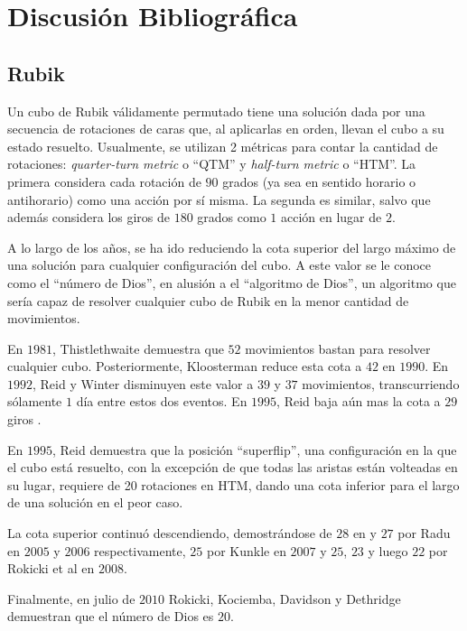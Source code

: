 \chapter{Discusión Bibliográfica}

\section*{Rubik}
Un cubo de Rubik válidamente permutado tiene una solución dada por una secuencia de rotaciones de caras que, al aplicarlas en orden, llevan el cubo a su estado resuelto. Usualmente, se utilizan 2 métricas para contar la cantidad de rotaciones: \emph{quarter-turn metric} o ``QTM'' y \emph{half-turn metric} o ``HTM''\cite{qtmhtm}. La primera considera cada rotación de $90$ grados (ya sea en sentido horario o antihorario) como una acción por sí misma. La segunda es similar, salvo que además considera los giros de $180$ grados como $1$ acción en lugar de $2$.

A lo largo de los años, se ha ido reduciendo la cota superior del largo máximo de una solución para cualquier configuración del cubo. A este valor se le conoce como el ``número de Dios'', en alusión a el ``algoritmo de Dios'', un algoritmo que sería capaz de resolver cualquier cubo de Rubik en la menor cantidad de movimientos.

En $1981$, Thistlethwaite\cite{thistlethwaite} demuestra que $52$ movimientos bastan para resolver cualquier cubo. Posteriormente, Kloosterman\cite{kloosterman} reduce esta cota a $42$ en $1990$. En $1992$, Reid y Winter disminuyen este valor a $39$ y $37$ movimientos, transcurriendo sólamente $1$ día entre estos dos eventos\cite{reid39}\cite{winter}. En $1995$, Reid baja aún mas la cota a $29$ giros \cite{reid29}.

En $1995$, Reid demuestra que la posición ``superflip'', una configuración en la que el cubo está resuelto, con la excepción de que todas las aristas están volteadas en su lugar, requiere de 20 rotaciones\cite{superflip} en HTM, dando una cota inferior para el largo de una solución en el peor caso.

La cota superior continuó descendiendo, demostrándose de $28$ en y $27$ por Radu\cite{radu28}\cite{radu27} en $2005$ y $2006$ respectivamente, $25$ por Kunkle\cite{kunkle} en $2007$ y $25$, $23$ y luego $22$ por Rokicki\cite{rokicki25}\cite{rokicki23}\cite{rokicki22} et al en $2008$.

Finalmente, en julio de $2010$ Rokicki, Kociemba, Davidson y Dethridge demuestran que el número de Dios es $20$\cite{godnumber20}.

